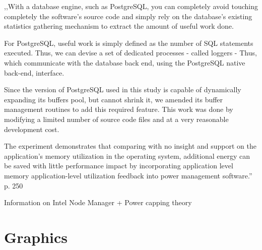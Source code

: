 \begin{appendices}
,,With a database engine, such as PostgreSQL, you can completely avoid touching completely the software's source code and simply rely on the database's existing statistics gathering mechanism to extract the amount of useful work done.

For PostgreSQL, useful work is simply defined as the number of SQL statements executed. Thus, we can devise a set of dedicated processes - called loggers - Thus, which communicate with the database back end, using the PostgreSQL native back-end, interface.

Since the version of PostgreSQL used in this study is capable of dynamically expanding its buffers pool, but cannot shrink it, we amended its buffer management routines to add this required feature. This work was done by modifying a limited number of source code files and at a very reasonable development cost.

The experiment demonstrates that comparing with no insight and support on the application's memory utilization in the operating system, additional energy can be saved with little performance impact by incorporating application level memory application-level utilization feedback into power management software.''
p. 250

Information on Intel\textsuperscript{\textregistered} Node Manager + Power capping theory
\clearpage{}
\section{Graphics}
\end{appendices}
